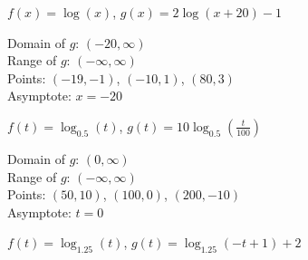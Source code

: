\documentclass{ximera}
\begin{document}
\begin{question}
\begin{problem}
\begin{solution}

\end{solution}
\end{problem}

\begin{problem}
$f(x) = \log(x)$, $g(x) = 2\log(x+20) -1$ 

\begin{solution}
    Domain of $g$: $(-20, \infty)$\\
 Range of $g$:  $(-\infty, \infty)$\\
 Points:  $(-19, -1)$, $(-10,1)$, $(80,3)$\\
 Asymptote:  $x = -20$ \\
\end{solution}
\end{problem}

\begin{problem}
$f(t) = \log_{0.5}(t)$, $g(t) = 10 \log_{0.5}\left(\frac{t}{100}\right)$

\begin{solution}
     Domain of $g$: $(0, \infty)$ \\
  Range of $g$:  $(-\infty, \infty)$ \\
  Points:  $(50,10)$,   $(100,0)$, $(200,-10)$  \\
  Asymptote: $t= 0$\\
\end{solution}
\end{problem}

\begin{problem}
$f(t) = \log_{1.25}(t)$, $g(t) = \log_{1.25}(-t+1) + 2$


\end{problem}
\end{question}
\end{document}
